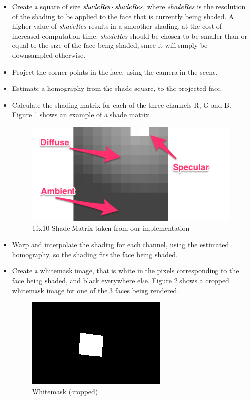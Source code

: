 \documentclass[a4paper,11pt]{article}
\begin{document}
\begin{itemize}
\item Create a square of size $\emph{shadeRes} \cdot \emph{shadeRes}$, where \emph{shadeRes} is the resolution of the shading to be applied to the face that is currently being shaded. A higher value of \emph{shadeRes} results in a smoother shading, at the cost of increased computation time. \emph{shadeRes} should be chosen to be smaller than or equal to the size of the face being shaded, since it will simply be downsampled otherwise.

\item Project the corner points in the face, using the camera in the scene.

\item Estimate a homography from the shade square, to the projected face.

\item Calculate the shading matrix for each of the three channels R, G and B. Figure \ref{fig:shade_matrix} shows an example of a shade matrix.

\begin{figure}[H]
  \centering
  \includegraphics[width=0.5\linewidth]{shade_explained}
  \caption{10x10 Shade Matrix taken from our implementation}
  \label{fig:shade_matrix}
\end{figure}

\item Warp and interpolate the shading for each channel, using the estimated homography, so the shading fits the face being shaded.

\item Create a whitemask image, that is white in the pixels corresponding to the face being shaded, and black everywhere else. Figure \ref{fig:whitemask} shows a cropped whitemask image for one of the 3 faces being rendered.

\begin{figure}[H]
  \centering
  \includegraphics[width=0.5\linewidth]{whitemask}
  \caption{Whitemask (cropped)}
  \label{fig:whitemask}
\end{figure}


\end{itemize}
\end{document}
